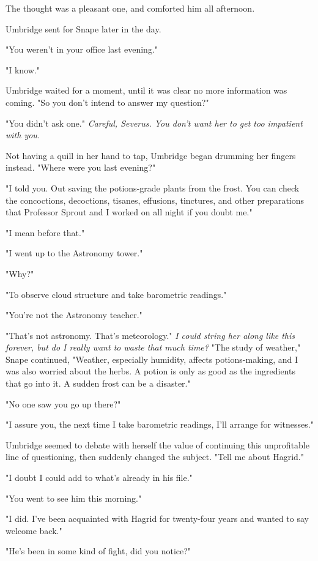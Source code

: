 The thought was a pleasant one, and comforted him all afternoon.

Umbridge sent for Snape later in the day.

"You weren't in your office last evening."

"I know."

Umbridge waited for a moment, until it was clear no more information was coming. "So you don't intend to answer my question?"

"You didn't ask one." \emph{Careful, Severus. You don't want her to get too impatient with you.}

Not having a quill in her hand to tap, Umbridge began drumming her fingers instead. "Where were you last evening?"

"I told you. Out saving the potions-grade plants from the frost. You can check the concoctions, decoctions, tisanes, effusions, tinctures, and other preparations that Professor Sprout and I worked on all night if you doubt me."

"I mean before that."

"I went up to the Astronomy tower."

"Why?"

"To observe cloud structure and take barometric readings."

"You're not the Astronomy teacher."

"That's not astronomy. That's meteorology." \emph{I could string her along like this forever, but do I really want to waste that much time?} "The study of weather," Snape continued, "Weather, especially humidity, affects potions-making, and I was also worried about the herbs. A potion is only as good as the ingredients that go into it. A sudden frost can be a disaster."

"No one saw you go up there?"

"I assure you, the next time I take barometric readings, I'll arrange for witnesses."

Umbridge seemed to debate with herself the value of continuing this unprofitable line of questioning, then suddenly changed the subject. "Tell me about Hagrid."

"I doubt I could add to what's already in his file."

"You went to see him this morning."

"I did. I've been acquainted with Hagrid for twenty-four years and wanted to say welcome back."

"He's been in some kind of fight, did you notice?"

